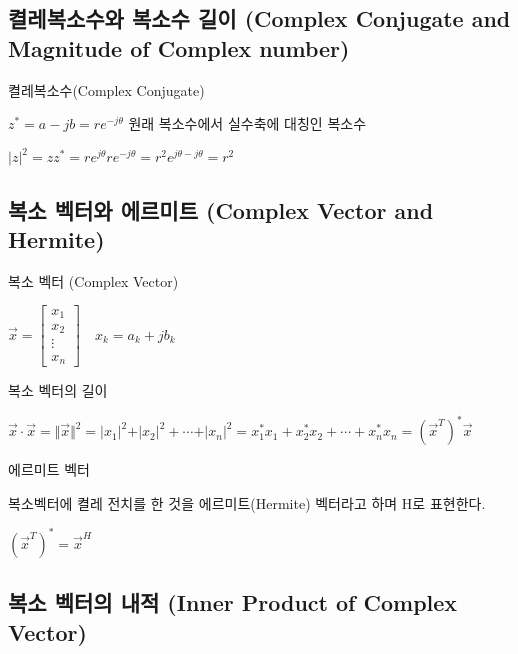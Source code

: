 \subsection{켤레복소수와 복소수 길이 (Complex Conjugate and Magnitude of Complex number)}

\begin{definition} 
켤레복소수(Complex Conjugate)

$z^{\ast} = a - jb = re^{-j\theta}$ 원래 복소수에서 실수축에 대칭인 복소수

$\vert z \vert^2 = zz^{\ast} = re^{j\theta}re^{-j\theta} = r^2e^{j\theta-j\theta} = r^2$
\end{definition}
\newpage
\subsection{복소 벡터와 에르미트 (Complex Vector and Hermite)}

\begin{definition} 
복소 벡터 (Complex Vector)

$\vec{x} = \begin{bmatrix} x_1 \\ x_2 \\ \vdots \\ x_n \end{bmatrix} \quad x_k = a_k + jb_k$

\end{definition}

\begin{definition} 
복소 벡터의 길이

$\vec{x} \cdot \vec{x} = \Vert \vec{x} \Vert^2 = \vert x_1 \vert^2 + \vert x_2 \vert^2 + \cdots + \vert x_n \vert^2 = x_1^{\ast}x_1 + x_2^{\ast}x_2 + \cdots + x_n^{\ast}x_n = (\vec{x}^{T})^{\ast}\vec{x}$

\end{definition}

\begin{definition} 
에르미트 벡터

복소벡터에 켤레 전치를 한 것을 에르미트(Hermite) 벡터라고 하며 H로 표현한다.

$(\vec{x}^{T})^{\ast} = \vec{x}^H$
\end{definition}

\newpage
\subsection{복소 벡터의 내적 (Inner Product of Complex Vector)}

